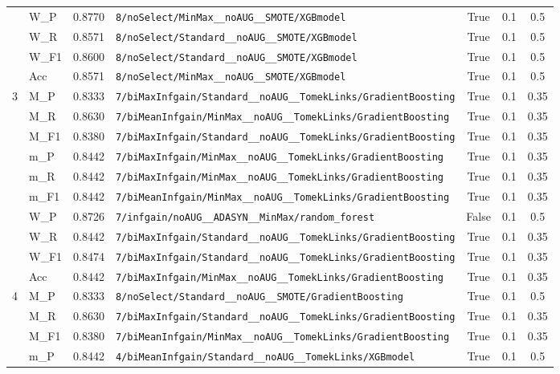 \begin{table}[htbp]
\begin{tabular}{|c|l|c|>{\ttfamily\footnotesize}p{7.2cm}|c|c|c|}
 & W\_P & 0.8770 & \texttt{8/noSelect/MinMax\_\_noAUG\_\_SMOTE/XGBmodel} & True & 0.1 & 0.5 \\
 & W\_R & 0.8571 & \texttt{8/noSelect/Standard\_\_noAUG\_\_SMOTE/XGBmodel} & True & 0.1 & 0.5 \\
 & W\_F1 & 0.8600 & \texttt{8/noSelect/Standard\_\_noAUG\_\_SMOTE/XGBmodel} & True & 0.1 & 0.5 \\
 & Acc & 0.8571 & \texttt{8/noSelect/MinMax\_\_noAUG\_\_SMOTE/XGBmodel} & True & 0.1 & 0.5 \\
\hline
\multirow{10}{*}{3} & M\_P & 0.8333 & \texttt{7/biMaxInfgain/Standard\_\_noAUG\_\_TomekLinks/GradientBoosting} & True & 0.1 & 0.35 \\
 & M\_R & 0.8630 & \texttt{7/biMeanInfgain/MinMax\_\_noAUG\_\_TomekLinks/GradientBoosting} & True & 0.1 & 0.35 \\
 & M\_F1 & 0.8380 & \texttt{7/biMaxInfgain/Standard\_\_noAUG\_\_TomekLinks/GradientBoosting} & True & 0.1 & 0.35 \\
 & m\_P & 0.8442 & \texttt{7/biMaxInfgain/MinMax\_\_noAUG\_\_TomekLinks/GradientBoosting} & True & 0.1 & 0.35 \\
 & m\_R & 0.8442 & \texttt{7/biMaxInfgain/MinMax\_\_noAUG\_\_TomekLinks/GradientBoosting} & True & 0.1 & 0.35 \\
 & m\_F1 & 0.8442 & \texttt{7/biMeanInfgain/MinMax\_\_noAUG\_\_TomekLinks/GradientBoosting} & True & 0.1 & 0.35 \\
 & W\_P & 0.8726 & \texttt{7/infgain/noAUG\_\_ADASYN\_\_MinMax/random\_forest} & False & 0.1 & 0.5 \\
 & W\_R & 0.8442 & \texttt{7/biMaxInfgain/Standard\_\_noAUG\_\_TomekLinks/GradientBoosting} & True & 0.1 & 0.35 \\
 & W\_F1 & 0.8474 & \texttt{7/biMaxInfgain/Standard\_\_noAUG\_\_TomekLinks/GradientBoosting} & True & 0.1 & 0.35 \\
 & Acc & 0.8442 & \texttt{7/biMaxInfgain/MinMax\_\_noAUG\_\_TomekLinks/GradientBoosting} & True & 0.1 & 0.35 \\
\hline
\multirow{10}{*}{4} & M\_P & 0.8333 & \texttt{8/noSelect/Standard\_\_noAUG\_\_SMOTE/GradientBoosting} & True & 0.1 & 0.5 \\
 & M\_R & 0.8630 & \texttt{7/biMaxInfgain/Standard\_\_noAUG\_\_TomekLinks/GradientBoosting} & True & 0.1 & 0.35 \\
 & M\_F1 & 0.8380 & \texttt{7/biMeanInfgain/MinMax\_\_noAUG\_\_TomekLinks/GradientBoosting} & True & 0.1 & 0.35 \\
 & m\_P & 0.8442 & \texttt{4/biMeanInfgain/Standard\_\_noAUG\_\_TomekLinks/XGBmodel} & True & 0.1 & 0.5 \\

\end{tabular}
\end{table}
